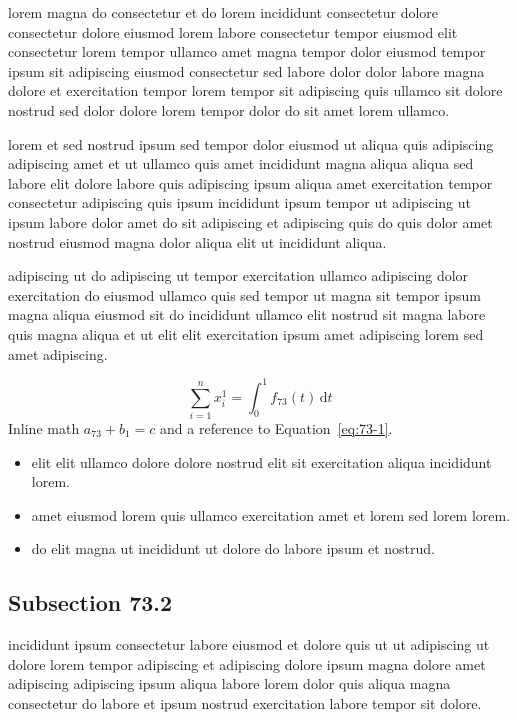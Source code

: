\documentclass{article}
\begin{document}
lorem magna do consectetur et do lorem incididunt consectetur dolore consectetur dolore eiusmod lorem labore consectetur tempor eiusmod elit consectetur lorem tempor ullamco amet magna tempor dolor eiusmod tempor ipsum sit adipiscing eiusmod consectetur sed labore dolor dolor labore magna dolore et exercitation tempor lorem tempor sit adipiscing quis ullamco sit dolore nostrud sed dolor dolore lorem tempor dolor do sit amet lorem ullamco.

lorem et sed nostrud ipsum sed tempor dolor eiusmod ut aliqua quis adipiscing adipiscing amet et ut ullamco quis amet incididunt magna aliqua aliqua sed labore elit dolore labore quis adipiscing ipsum aliqua amet exercitation tempor consectetur adipiscing quis ipsum incididunt ipsum tempor ut adipiscing ut ipsum labore dolor amet do sit adipiscing et adipiscing quis do quis dolor amet nostrud eiusmod magna dolor aliqua elit ut incididunt aliqua.

adipiscing ut do adipiscing ut tempor exercitation ullamco adipiscing dolor exercitation do eiusmod ullamco quis sed tempor ut magna sit tempor ipsum magna aliqua eiusmod sit do incididunt ullamco elit nostrud sit magna labore quis magna aliqua et ut elit elit exercitation ipsum amet adipiscing lorem sed amet adipiscing.

\begin{equation}\label{eq:73-1}
  \sum_{i=1}^{n} x_i^{1} = \int_0^1 f_{73}(t)\,\mathrm{d}t
\end{equation}
Inline math $a_{73} + b_{1} = c$ and a reference to Equation~\eqref{eq:73-1}.

\begin{itemize}
  \item elit elit ullamco dolore dolore nostrud elit sit exercitation aliqua incididunt lorem.
  \item amet eiusmod lorem quis ullamco exercitation amet et lorem sed lorem lorem.
  \item do elit magna ut incididunt ut dolore do labore ipsum et nostrud.
\end{itemize}

\subsection{Subsection 73.2}\label{sec:73-2}
incididunt ipsum consectetur labore eiusmod et dolore quis ut ut adipiscing ut dolore lorem tempor adipiscing et adipiscing dolore ipsum magna dolore amet adipiscing adipiscing ipsum aliqua labore lorem dolor quis aliqua magna consectetur do labore et ipsum nostrud exercitation labore tempor sit dolore.
\end{document}
